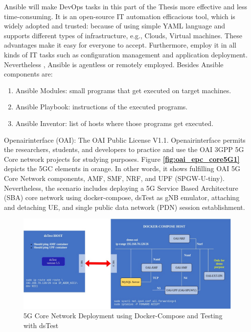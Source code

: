 Ansible will make DevOps tasks in this part of the Thesis more effective and less time-consuming. It is an open-source IT automation efficacious tool, which is widely adopted and trusted: because of using simple YAML language and supports different types of infrastructure, e.g., Clouds, Virtual machines. These advantages make it easy for everyone to accept. Furthermore, employ it in all kinds of IT tasks such as configuration management and application deployment. Nevertheless 
, Ansible is agentless or remotely employed.
Besides Ansible components are:
\begin{enumerate}
    \item Ansible Modules: small programs that get executed on target machines.
    \item Ansible Playbook: instructions of the executed programs.
    \item Ansible Inventor: list of hosts where those programs get executed.
\end{enumerate}
Openairinterface (OAI):
The OAI Public License V1.1. Openairinterface permits the researchers, students, and developers to practice and use the OAI 3GPP 5G Core network projects for studying purposes. Figure
\textbf{\ref{fig:oai_epc_core5G1}} depicts the 5GC elements in orange. In other words, it shows fulfilling OAI 5G Core Network components, AMF, SMF, NRF, and UPF (SPGW-U-tiny). Nevertheless, the scenario includes deploying a 5G Service Based Architecture (SBA) core network using docker-compose, dsTest as gNB emulator, attaching and detaching UE, and single public data network (PDN) session establishment.


\begin{figure}
\centering
\includegraphics[scale=0.32]{images/OAI5GC_Deployment_using_Docker-Compose_and_Testing_with_dsTest.png}
\caption{5G Core Network Deployment using Docker-Compose and Testing with dsTest \cite{openairinterface2014}}
\label{fig:5GC_Deployment_using_Docker-Compose_and_Testing_with_dsTest}
\end{figure}


